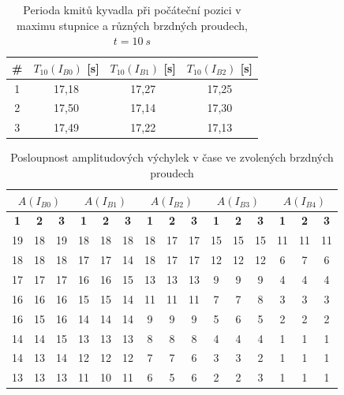 \documentclass[a4paper,12pt]{article}
\begin{document}
\begin{table}[H]
    \centering
    \renewcommand{\arraystretch}{1.5}
    \begin{tabular}{|c|c|c|c|}
        \hline
        \textbf{\#} & \textbf{$T_{10}(I_{B0})$ [s]} & \textbf{$T_{10}(I_{B1})$ [s]} & \textbf{$T_{10}(I_{B2})$ [s]} \\ \hline
        1 & 17,18 & 17,27 & 17,25 \\ \hline
        2 & 17,50 & 17,14 & 17,30 \\ \hline
        3 & 17,49 & 17,22 & 17,13 \\ \hline
    \end{tabular}
    \caption{Perioda kmitů kyvadla při počáteční pozici v maximu stupnice a různých brzdných proudech, $t=10\ s$}
    \label{tab:perioda}
\end{table}

\begin{table}[H]
    \centering
    \renewcommand{\arraystretch}{1.5}
    \begin{tabular}{|c|c|c||c|c|c||c|c|c||c|c|c||c|c|c|}
        \hline
        \multicolumn{3}{|c||}{$A(I_{B0})$} 
        & \multicolumn{3}{c||}{$A(I_{B1})$} 
        & \multicolumn{3}{c||}{$A(I_{B2})$} 
        & \multicolumn{3}{c||}{$A(I_{B3})$} 
        & \multicolumn{3}{c|}{$A(I_{B4})$} \\ \hline
        \textbf{1} & \textbf{2} & \textbf{3} 
        & \textbf{1} & \textbf{2} & \textbf{3} 
        & \textbf{1} & \textbf{2} & \textbf{3} 
        & \textbf{1} & \textbf{2} & \textbf{3} 
        & \textbf{1} & \textbf{2} & \textbf{3} \\ \hline
        19 & 18 & 19 & 18 & 18 & 18 & 18 & 17 & 17 & 15 & 15 & 15 & 11 & 11 & 11 \\ \hline
        18 & 18 & 18 & 17 & 17 & 14 & 18 & 17 & 17 & 12 & 12 & 12 & 6 & 7 & 6 \\ \hline
        17 & 17 & 17 & 16 & 16 & 15 & 13 & 13 & 13 & 9 & 9 & 9 & 4 & 4 & 4 \\ \hline
        16 & 16 & 16 & 15 & 15 & 14 & 11 & 11 & 11 & 7 & 7 & 8 & 3 & 3 & 3 \\ \hline
        16 & 15 & 16 & 14 & 14 & 14 & 9 & 9 & 9 & 5 & 6 & 5 & 2 & 2 & 2 \\ \hline
        14 & 14 & 15 & 13 & 13 & 13 & 8 & 8 & 8 & 4 & 4 & 4 & 1 & 1 & 1 \\ \hline
        14 & 13 & 14 & 12 & 12 & 12 & 7 & 7 & 6 & 3 & 3 & 2 & 1 & 1 & 1 \\ \hline
        13 & 13 & 13 & 11 & 10 & 11 & 6 & 5 & 6 & 2 & 2 & 3 & 1 & 1 & 1 \\ \hline
    \end{tabular}
    \caption{Posloupnost amplitudových výchylek v čase ve zvolených brzdných proudech}
    \label{tab:posloupnost}
\end{table}
\end{document}
